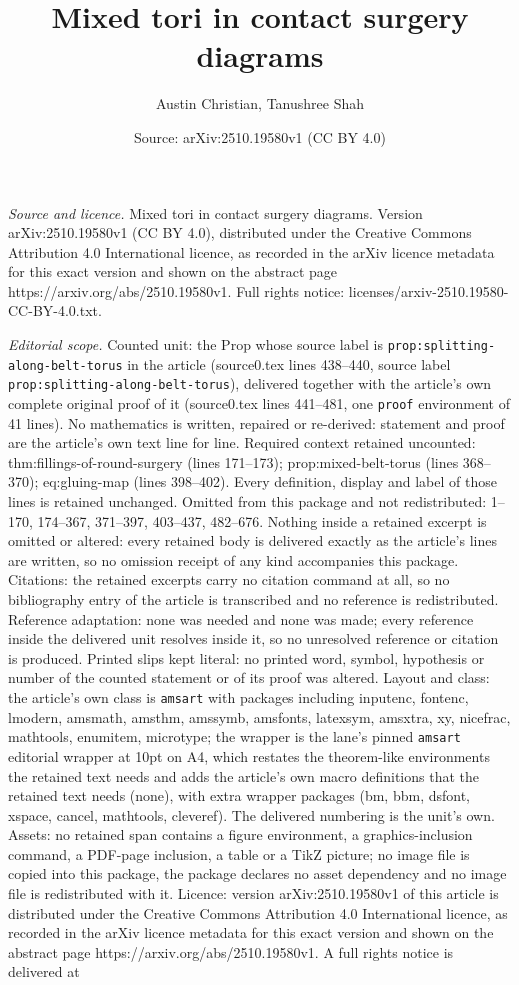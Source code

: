 \documentclass[10pt,a4paper]{amsart}
\title[Mixed tori in contact surgery diagrams]{Mixed tori in contact surgery diagrams}
\author{Austin Christian, Tanushree Shah}
\date{Source: arXiv:2510.19580v1 (CC BY 4.0)}
\begin{document}
\maketitle

\noindent\emph{Source and licence.} Mixed tori in contact surgery diagrams. Version arXiv:2510.19580v1 (CC BY 4.0), distributed under the Creative Commons Attribution 4.0 International licence, as recorded in the arXiv licence metadata for this exact version and shown on the abstract page https://arxiv.org/abs/2510.19580v1. Full rights notice: licenses/arxiv-2510.19580-CC-BY-4.0.txt.\par\smallskip

\noindent\textit{Editorial scope.} Counted unit: the Prop whose source label is \texttt{prop:splitting-along-belt-torus} in the article (source0.tex lines 438--440, source label \texttt{prop:splitting-along-belt-torus}), delivered together with the article's own complete original proof of it (source0.tex lines 441--481, one \texttt{proof} environment of 41 lines). No mathematics is written, repaired or re-derived: statement and proof are the article's own text line for line. Required context retained uncounted: thm:fillings-of-round-surgery (lines 171--173); prop:mixed-belt-torus (lines 368--370); eq:gluing-map (lines 398--402). Every definition, display and label of those lines is retained unchanged. Omitted from this package and not redistributed: 1--170, 174--367, 371--397, 403--437, 482--676. Nothing inside a retained excerpt is omitted or altered: every retained body is delivered exactly as the article's lines are written, so no omission receipt of any kind accompanies this package. Citations: the retained excerpts carry no citation command at all, so no bibliography entry of the article is transcribed and no reference is redistributed. Reference adaptation: none was needed and none was made; every reference inside the delivered unit resolves inside it, so no unresolved reference or citation is produced. Printed slips kept literal: no printed word, symbol, hypothesis or number of the counted statement or of its proof was altered. Layout and class: the article's own class is \texttt{amsart} with packages including inputenc, fontenc, lmodern, amsmath, amsthm, amssymb, amsfonts, latexsym, amsxtra, xy, nicefrac, mathtools, enumitem, microtype; the wrapper is the lane's pinned \texttt{amsart} editorial wrapper at 10pt on A4, which restates the theorem-like environments the retained text needs and adds the article's own macro definitions that the retained text needs (none), with extra wrapper packages (bm, bbm, dsfont, xspace, cancel, mathtools, cleveref). The delivered numbering is the unit's own. Assets: no retained span contains a figure environment, a graphics-inclusion command, a PDF-page inclusion, a table or a TikZ picture; no image file is copied into this package, the package declares no asset dependency and no image file is redistributed with it. Licence: version arXiv:2510.19580v1 of this article is distributed under the Creative Commons Attribution 4.0 International licence, as recorded in the arXiv licence metadata for this exact version and shown on the abstract page https://arxiv.org/abs/2510.19580v1. A full rights notice is delivered at 
\end{document}
